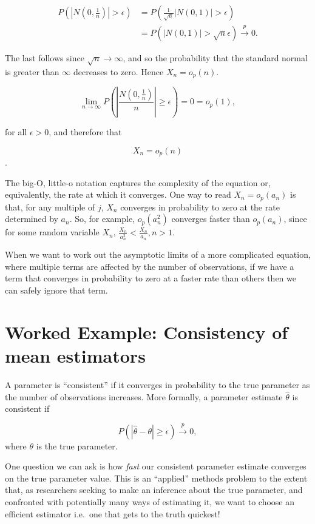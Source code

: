 \documentclass[
]{book}
\begin{document}
\[\begin{aligned}
P(|N(0,\frac{1}{n})|> \epsilon) &= P(\frac{1}{\sqrt{n}}|N(0,1)| > \epsilon )\\
&= P(|N(0,1)| > \sqrt{n}\epsilon) \xrightarrow{p} 0.
\end{aligned}\]

The last follows since \(\sqrt{n} \to \infty\), and so the probability that the standard normal is greater than \(\infty\) decreases to zero. Hence \(X_n = o_p(n)\).

\[ \lim_{n\to\infty}P\left( \left| \frac{N(0,\frac{1}{n})}{n} \right| \geq \epsilon \right) = 0 = o_p(1), \]

for all \(\epsilon > 0\), and therefore that

\[X_n = o_p(n)\].

The big-O, little-o notation captures the complexity of the equation or, equivalently, the rate at which it converges. One way to read \(X_n = o_p(a_n)\) is that, for any multiple of \(j\), \(X_n\) converges in probability to zero at the rate determined by \(a_n\). So, for example, \(o_p(a_n^2)\) converges faster than \(o_p(a_n)\), since for some random variable \(X_n\), \(\frac{X_n}{a_n^2} < \frac{X_n}{a_n}, n > 1.\)

When we want to work out the asymptotic limits of a more complicated equation, where multiple terms are affected by the number of observations, if we have a term that converges in probability to zero at a faster rate than others then we can safely ignore that term.

\hypertarget{estimator_consistency}{%
\section{Worked Example: Consistency of mean estimators}\label{estimator_consistency}}

A parameter is ``consistent'' if it converges in probability to the true parameter as the number of observations increases. More formally, a parameter estimate \(\hat{\theta}\) is consistent if

\[ P(|\hat{\theta} - \theta| \geq \epsilon) \xrightarrow{p} 0, \]
where \(\theta\) is the true parameter.

One question we can ask is how \emph{fast} our consistent parameter estimate converges on the true parameter value. This is an ``applied'' methods problem to the extent that, as researchers seeking to make an inference about the true parameter, and confronted with potentially many ways of estimating it, we want to choose an efficient estimator i.e.~one that gets to the truth quickest!
\end{document}
